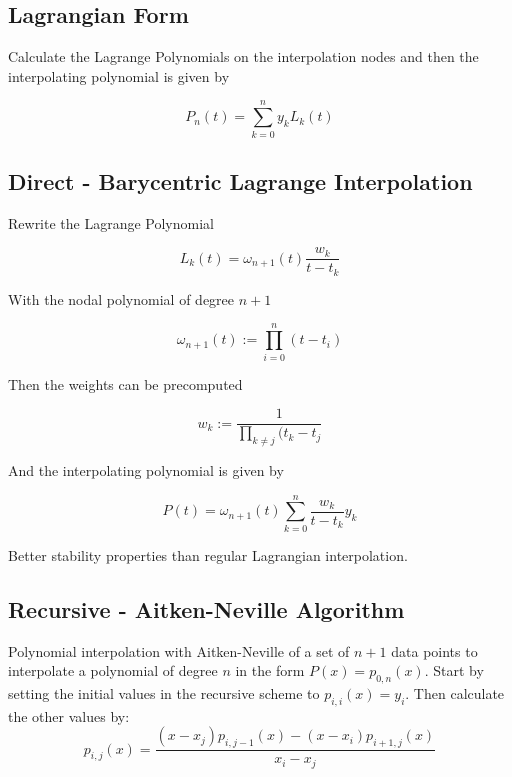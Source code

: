 \documentclass[
    a4paper,
    11pt
]{article}
\begin{document}
\subsection{Lagrangian Form}

Calculate the Lagrange Polynomials on the interpolation nodes and then the
interpolating polynomial is given by

\begin{equation}
    P_n(t) = \sum_{k=0}^n y_k L_k(t)
\end{equation}

\subsection{Direct - Barycentric Lagrange Interpolation}

Rewrite the Lagrange Polynomial

\begin{equation}
    L_k(t) = \omega_{n+1}(t) \frac{w_k}{t-t_k}
\end{equation}

With the nodal polynomial of degree $n+1$

\begin{equation}
    \omega_{n+1}(t) := \prod_{i=0}^n (t - t_i)
\end{equation}

Then the weights can be precomputed

\begin{equation}
    w_k := \frac{1}{\prod_{k\neq j} (t_k - t_j}
\end{equation}

And the interpolating polynomial is given by

\begin{equation}
    P(t) = \omega_{n+1}(t) \sum_{k=0}^n \frac{w_k}{t-t_k} y_k
\end{equation}

Better stability properties than regular Lagrangian interpolation.

\subsection{Recursive - Aitken-Neville Algorithm}

Polynomial interpolation with Aitken-Neville of a set of $n+1$ data points to
interpolate a polynomial of degree $n$ in the form $P(x) = p_{0,n}(x)$. Start by
setting the initial values in the recursive scheme to $p_{i,i}(x)=y_i$. Then
calculate the other values by:
\begin{equation}
    p_{i,j}(x) = \frac{(x-x_j)p_{i,j-1}(x) - (x-x_i)p_{i+1,j}(x)}{x_i - x_j}
\end{equation}
\end{document}
